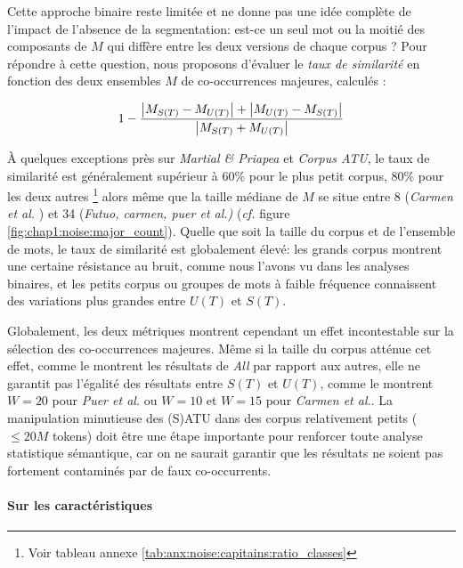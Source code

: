 Cette approche binaire reste limitée et ne donne pas une idée complète de l'impact de l'absence de la segmentation: est-ce un seul mot ou la moitié des composants de $M$ qui diffère entre les deux versions de chaque corpus ? Pour répondre à cette question, nous proposons d'évaluer le \textit{taux de similarité} en fonction des deux ensembles $M$ de co-occurrences majeures, calculés :

\begin{equation*}
    1 - \frac{%
        \left | M_{S(T)} - M_{U(T)} \right | + \left | M_{U(T)} - M_{S(T)} \right |%
    }{%
       \left | M_{S(T)} + M_{U(T)} \right |%
    }
\end{equation*}

À quelques exceptions près sur \textit{Martial \& Priapea} et \textit{Corpus ATU}, le taux de similarité est généralement supérieur à 60\% pour le plus petit corpus, 80\% pour les deux autres \footnote{Voir tableau annexe \ref{tab:anx:noise:capitains:ratio_classes}} alors même que la taille médiane de $M$ se situe entre 8 (\textit{Carmen et al. }) et 34 (\textit{Futuo, carmen, puer et al.)} (\textit{cf.} figure \ref{fig:chap1:noise:major_count}). Quelle que soit la taille du corpus et de l'ensemble de mots, le taux de similarité est globalement élevé: les grands corpus montrent une certaine résistance au bruit, comme nous l'avons vu dans les analyses binaires, et les petits corpus ou groupes de mots à faible fréquence connaissent des variations plus grandes entre $U(T)$ et $S(T)$.

Globalement, les deux métriques montrent cependant un effet incontestable sur la sélection des co-occurrences majeures. Même si la taille du corpus atténue cet effet, comme le montrent les résultats de \textit{All} par rapport aux autres, elle ne garantit pas l'égalité des résultats entre $S(T)$ et $U(T)$, comme le montrent $W=20$ pour \textit{Puer et al.} ou $W=10$ et $W=15$ pour \textit{Carmen et al.}. La manipulation minutieuse des (S)ATU dans des corpus relativement petits ($\leq20M$ tokens) doit être une étape importante pour renforcer toute analyse statistique sémantique, car on ne saurait garantir que les résultats ne soient pas fortement contaminés par de faux co-occurrents.


\paragraph{Sur les caractéristiques}
\label{sub:clustering}

